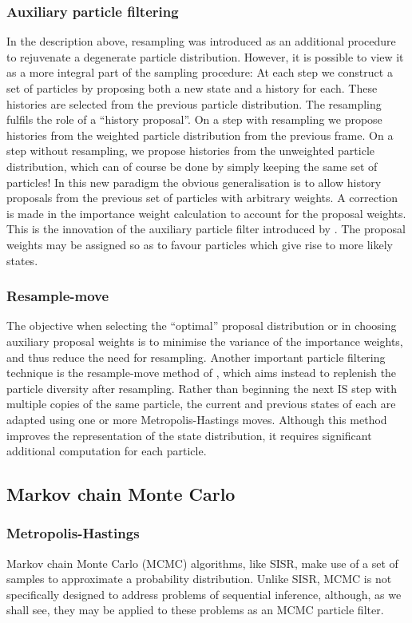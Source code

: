 \subsubsection{Auxiliary particle filtering}
In the description above, resampling was introduced as an additional procedure to rejuvenate a degenerate particle distribution. However, it is possible to view it as a more integral part of the sampling procedure: At each step we construct a set of particles by proposing both a new state and a history for each. These histories are selected from the previous particle distribution. The resampling fulfils the role of a ``history proposal''. On a step with resampling we propose histories from the weighted particle distribution from the previous frame. On a step without resampling, we propose histories from the unweighted particle distribution, which can of course be done by simply keeping the same set of particles! In this new paradigm the obvious generalisation is to allow history proposals from the previous set of particles with arbitrary weights. A correction is made in the importance weight calculation to account for the proposal weights. This is the innovation of the auxiliary particle filter introduced by \cite{Pitt1999}. The proposal weights may be assigned so as to favour particles which give rise to more likely states.

\subsubsection{Resample-move}
The objective when selecting the ``optimal'' proposal distribution or in choosing auxiliary proposal weights is to minimise the variance of the importance weights, and thus reduce the need for resampling. Another important particle filtering technique is the resample-move method of \cite{Gilks2001}, which aims instead to replenish the particle diversity after resampling. Rather than beginning the next IS step with multiple copies of the same particle, the current and previous states of each are adapted using one or more Metropolis-Hastings moves. Although this method improves the representation of the state distribution, it requires significant additional computation for each particle.



\subsection{Markov chain Monte Carlo}

\subsubsection{Metropolis-Hastings}
Markov chain Monte Carlo (MCMC) algorithms, like SISR, make use of a set of samples to approximate a probability distribution. Unlike SISR, MCMC is not specifically designed to address problems of sequential inference, although, as we shall see, they may be applied to these problems as an MCMC particle filter.

